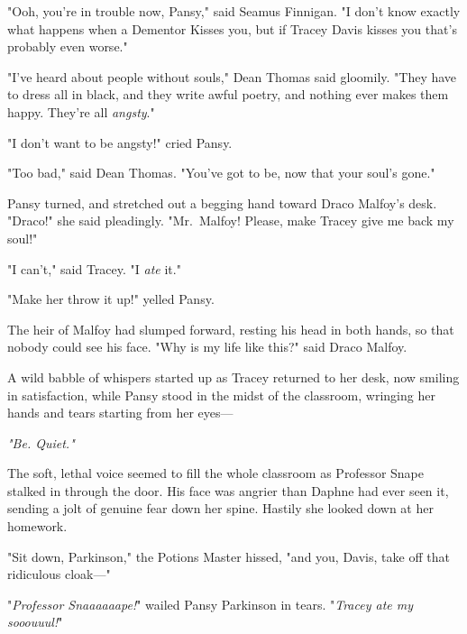 "Ooh, you're in trouble now, Pansy," said Seamus Finnigan. "I don't know 
exactly what happens when a Dementor Kisses you, but if Tracey Davis kisses you 
that's probably even worse."

"I've heard about people without souls," Dean Thomas said gloomily. "They have 
to dress all in black, and they write awful poetry, and nothing ever makes them 
happy. They're all \emph{angsty}."

"I don't want to be angsty!" cried Pansy.

"Too bad," said Dean Thomas. "You've got to be, now that your soul's gone."

Pansy turned, and stretched out a begging hand toward Draco Malfoy's desk. 
"Draco!" she said pleadingly. "Mr.~Malfoy! Please, make Tracey give me back my 
soul!"

"I can't," said Tracey. "I \emph{ate} it."

"Make her throw it up!" yelled Pansy.

The heir of Malfoy had slumped forward, resting his head in both hands, so that 
nobody could see his face. "Why is my life like this?" said Draco Malfoy.

A wild babble of whispers started up as Tracey returned to her desk, now 
smiling in satisfaction, while Pansy stood in the midst of the classroom, 
wringing her hands and tears starting from her eyes---

\emph{"Be. Quiet."}

The soft, lethal voice seemed to fill the whole classroom as Professor Snape 
stalked in through the door. His face was angrier than Daphne had ever seen it, 
sending a jolt of genuine fear down her spine. Hastily she looked down at her 
homework.

"Sit down, Parkinson," the Potions Master hissed, "and you, Davis, take off 
that ridiculous cloak---"

"\emph{Professor Snaaaaaape!}" wailed Pansy Parkinson in tears. "\emph{Tracey 
ate my sooouuul!}"